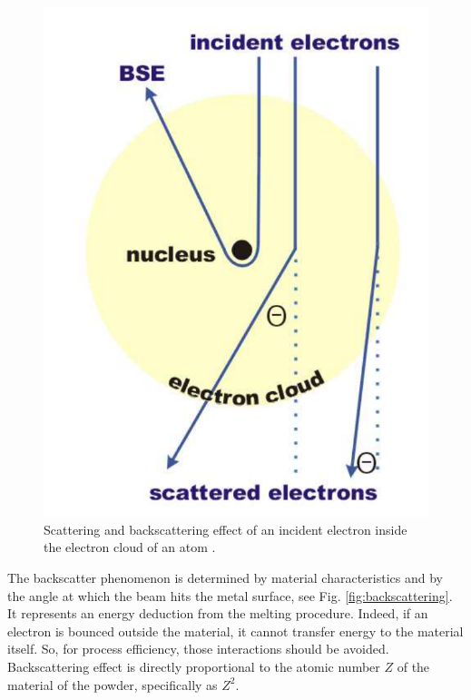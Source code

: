 \begin{figure}
    \centering
    \includegraphics[scale=0.4]{Images/electrons.png}
    \caption[Scattering and backscattering of an electron.]{Scattering and backscattering effect of an incident electron inside the electron cloud of an atom \cite{krumeich_properties_2015}.}
    \label{fig:electronsscattering}
\end{figure}
The backscatter phenomenon is determined by material characteristics and by the angle at which the beam hits the metal surface, see Fig. \ref{fig:backscattering}. It represents an energy deduction from the melting procedure. Indeed, if an electron is bounced outside the material, it cannot transfer energy to the material itself. So, for process efficiency, those interactions should be avoided. Backscattering effect is directly proportional to the atomic number $Z$ of the material of the powder, specifically as $Z^2$.

